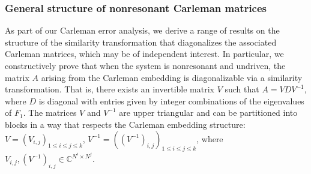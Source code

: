 \documentclass[superscriptaddress,onecolumn,nofootinbib,longbibliography,a4paper,accepted=2026-09-29]{quantumarticle}
\theoremstyle{plain}
\theoremstyle{definition}
\numberwithin{thm}{section}
\numberwithin{assumption}{section}
\numberwithin{lemma}{section}
\numberwithin{prop}{section}
\numberwithin{cor}{section}
\numberwithin{definition}{section}
\numberwithin{rmk}{section}
\numberwithin{equation}{section}
\begin{document}
\subsubsection{General structure of nonresonant Carleman matrices}
\label{subsubsec:general_structure_carleman_matrix}
As part of our Carleman error analysis, we derive a range of results on the structure of the similarity transformation that diagonalizes the associated Carleman matrices, which may be of independent interest. In particular, we constructively prove that when the system is nonresonant and undriven, the matrix $A$ arising from the Carleman embedding is diagonalizable via a similarity transformation. That is, there exists an invertible matrix $V$ such that $A = V D V^{-1}$, where $D$ is diagonal with entries given by integer combinations of the eigenvalues of $F_1$. The matrices $V$ and $V^{-1}$ are upper triangular and can be partitioned into blocks in a way that respects the Carleman embedding structure: $V = (V_{i,j})_{1 \le i \le j \le k}$, $V^{-1} = ((V^{-1})_{i,j})_{1 \le i \le j \le k}$, where $V_{i,j}, (V^{-1})_{i,j} \in \mathbb{C}^{N^i \times N^j}$. 
\end{document}
